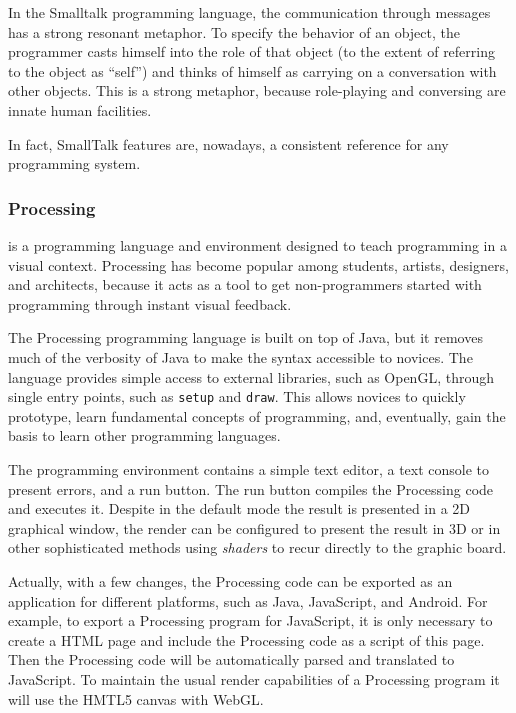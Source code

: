 In the Smalltalk programming language, the communication through messages has a strong resonant metaphor. To specify the behavior of an object, the programmer casts himself into the role of that object (to the extent of referring to the object as ``self'') and thinks of himself as carrying on a conversation with other objects. This is a strong metaphor, because role-playing and conversing are innate human facilities. 

In fact, SmallTalk features are, nowadays, a consistent reference for any programming system.
\subsubsection{Processing~\cite{Reas2006}} is a programming language and environment designed to teach programming in a visual context. Processing has become popular among students, artists, designers, and architects, because it acts as a tool to get non-programmers started with programming through instant visual feedback.

The Processing programming language is built on top of Java, but it removes much of the verbosity of Java to make the syntax accessible to novices. The language provides simple access to external libraries, such as OpenGL, through single entry points, such as \texttt{setup} and \texttt{draw}. This allows novices to quickly prototype, learn fundamental concepts of programming, and, eventually, gain the basis to learn other programming languages.

The programming environment contains a simple text editor, a text console to present errors, and a run button. The run button compiles the Processing code and executes it. Despite in the default mode the result is presented in a 2D graphical window, the render can be configured to present the result in 3D or in other sophisticated methods using \textit{shaders} to recur directly to the graphic board.

Actually, with a few changes, the Processing code can be exported as an application for different platforms, such as Java, JavaScript, and Android. For example, to export a Processing program for JavaScript, it is only necessary to create a HTML page and include the Processing code as a script of this page. Then the Processing code will be automatically parsed and translated to JavaScript. To maintain the usual render capabilities of a Processing program it will use the HMTL5 canvas with WebGL.

